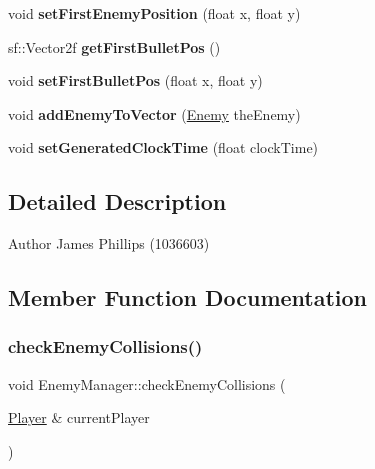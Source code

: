 \begin{DoxyCompactItemize}
void {\bfseries set\+First\+Enemy\+Position} (float x, float y)
\item 
\mbox{\label{class_enemy_manager_a0632e71c86c73e74708d34df6d1fefba}} 
sf\+::\+Vector2f {\bfseries get\+First\+Bullet\+Pos} ()
\item 
\mbox{\label{class_enemy_manager_a217800f39e93529dc7c912857f5a4228}} 
void {\bfseries set\+First\+Bullet\+Pos} (float x, float y)
\item 
\mbox{\label{class_enemy_manager_a73b9e07b84f4c25f88d09744aa373f3b}} 
void {\bfseries add\+Enemy\+To\+Vector} (\hyperlink{class_enemy}{Enemy} the\+Enemy)
\item 
\mbox{\label{class_enemy_manager_a6258b25ccc4866129f9bfe176ee22c1f}} 
void {\bfseries set\+Generated\+Clock\+Time} (float clock\+Time)
\end{DoxyCompactItemize}


\subsection{Detailed Description}
\begin{DoxyAuthor}{Author}
James Phillips (1036603) 
\end{DoxyAuthor}


\subsection{Member Function Documentation}
\mbox{\label{class_enemy_manager_a317b11ce52e67c7b760b2b81755fd95f}} 
\subsubsection{\texorpdfstring{check\+Enemy\+Collisions()}{checkEnemyCollisions()}}
{\footnotesize\ttfamily void Enemy\+Manager\+::check\+Enemy\+Collisions (\begin{DoxyParamCaption}\item[{\hyperlink{class_player}{Player} \&}]{current\+Player }\end{DoxyParamCaption})}



